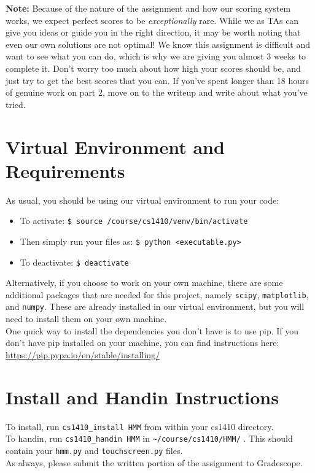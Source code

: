 \documentclass{article}
\begin{document}
\textbf{Note:} Because of the nature of the assignment and how our scoring system works, we expect perfect scores to be \textit{exceptionally} rare. While we as TAs can give you ideas or guide you in the right direction, it may be worth noting that even our own solutions are not optimal! We know this assignment is difficult and want to see what you can do, which is why we are giving you almost 3 weeks to complete it. Don't worry too much about how high your scores should be, and just try to get the best scores that you can. If you've spent longer than 18 hours of genuine work on part 2, move on to the writeup and write about what you've tried.
        
    \section{Virtual Environment and Requirements}
    As usual, you should be using our virtual environment to run your code:
    \begin{itemize}
    \setlength\itemsep{0em}
    \item[] To activate: \texttt{\$ source /course/cs1410/venv/bin/activate}
    \item[] Then simply run your files as: \texttt{\$ python <executable.py>}
    \item[] To deactivate: \texttt{\$ deactivate}
    \end{itemize}
    
    Alternatively, if you choose to work on your own machine, there are some additional packages that are needed for this project, namely \texttt{scipy}, \texttt{matplotlib}, and \texttt{numpy}. These are already installed in our virtual environment, but you will need to install them on your own machine.\\
    
    One quick way to install the dependencies you don't have is to use pip. If you don't have pip installed on your machine, you can find instructions here: \url{https://pip.pypa.io/en/stable/installing/}

    \section{Install and Handin Instructions}
    To install, run \verb|cs1410_install HMM| from within your cs1410 directory. ~\\

    To handin, run \verb|cs1410_handin HMM| in  \verb|~/course/cs1410/HMM/| . This should contain your \verb|hmm.py| and \verb|touchscreen.py| files.~\\
    
    As always, please submit the written portion of the assignment to Gradescope.\\
    
\end{document}
